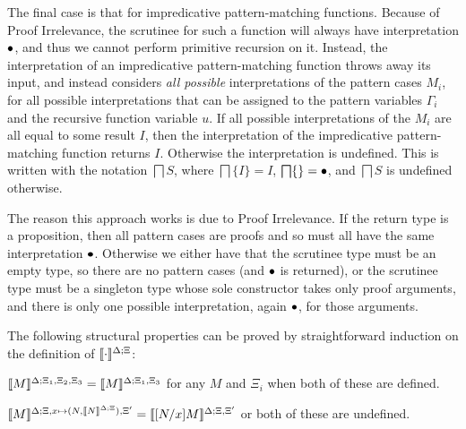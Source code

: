 \documentclass{article}
\begin{document}
The final case is that for impredicative pattern-matching functions.
Because of Proof Irrelevance, the scrutinee for such a function will
always have interpretation $\dummy$, and thus we cannot perform
primitive recursion on it. Instead, the interpretation of an
impredicative pattern-matching function throws away its input, and
instead considers \emph{all possible} interpretations of the pattern
cases $M_i$, for all possible interpretations that can be assigned to
the pattern variables $\Gamma_i$ and the recursive function variable
$u$.  If all possible interpretations of the $M_i$ are all
equal to some result $I$, then the interpretation of the impredicative
pattern-matching function returns $I$. Otherwise the interpretation is
undefined. This is written with the notation $\bigsqcap S$, where
$\bigsqcap\{I\}=I$, $\bigsqcap\{\}=\dummy$, and $\bigsqcap S$ is
undefined otherwise.

The reason this approach works is due to Proof Irrelevance. If the
return type is a proposition, then all pattern cases are proofs and so
must all have the same interpretation $\dummy$. Otherwise we either
have that the scrutinee type must be an empty type, so there are no
pattern cases (and $\dummy$ is returned), or the scrutinee type must
be a singleton type whose sole constructor takes only proof arguments,
and there is only one possible interpretation, again $\dummy$, for
those arguments.


The following structural properties can be proved by straightforward
induction on the definition of $\interp{\cdot}$:

\begin{lemma}
  \label{lemma:weakening}
  $\interp[\iargs{\Delta}{\Xi_1,\Xi_2,\Xi_3}]{M}=\interp[\iargs{\Delta}{\Xi_1,\Xi_3}]{M}$
  for any $M$ and $\Xi_i$ when both of these are defined.
\end{lemma}


\begin{lemma}
  \label{lemma:substitution}
  $\interp[\iargs{\Delta}{\Xi,\dxform{N}{\interp{N}}},\Xi']{M}=
  \interp[\iargs{\Delta}{\Xi,\Xi'}]{[N/x]M}$ or both of these are
  undefined. %
\end{lemma}



\end{document}

